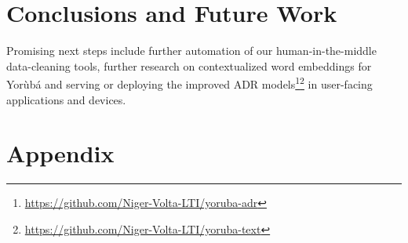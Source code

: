 \documentclass{article} %
\begin{document}
  
\section{Conclusions and Future Work}

Promising next steps include further automation of our human-in-the-middle data-cleaning tools, further research on contextualized word embeddings for Yor{\`u}b{\'a} and serving or deploying the improved ADR models\footnote{\url{https://github.com/Niger-Volta-LTI/yoruba-adr}}\footnote{\url{https://github.com/Niger-Volta-LTI/yoruba-text}} in user-facing applications and devices.  





\appendix
\section{Appendix}\label{sec:appendix}
\end{document}
